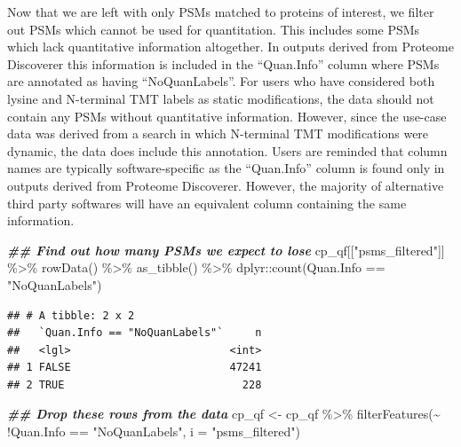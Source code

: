 \documentclass[9pt,a4paper,]{extarticle}
\newenvironment{Shaded}{\begin{snugshade}}{\end{snugshade}}
\newcommand{\AttributeTok}[1]{\textcolor[rgb]{0.77,0.63,0.00}{#1}}
\newcommand{\DocumentationTok}[1]{\textcolor[rgb]{0.56,0.35,0.01}{\textbf{\textit{#1}}}}
\newcommand{\FunctionTok}[1]{\textcolor[rgb]{0.00,0.00,0.00}{#1}}
\newcommand{\NormalTok}[1]{#1}
\newcommand{\OtherTok}[1]{\textcolor[rgb]{0.56,0.35,0.01}{#1}}
\newcommand{\SpecialCharTok}[1]{\textcolor[rgb]{0.00,0.00,0.00}{#1}}
\newcommand{\StringTok}[1]{\textcolor[rgb]{0.31,0.60,0.02}{#1}}
\begin{document}
Now that we are left with only PSMs matched to proteins of interest, we filter
out PSMs which cannot be used for quantitation. This includes some PSMs which
lack quantitative information altogether. In outputs derived from Proteome
Discoverer this information is included in the ``Quan.Info'' column where PSMs are
annotated as having ``NoQuanLabels''. For users who have considered both lysine and
N-terminal TMT labels as static modifications, the data should not contain any
PSMs without quantitative information. However, since the use-case data was
derived from a search in which N-terminal TMT modifications were dynamic, the
data does include this annotation. Users are reminded that column names are
typically software-specific as the ``Quan.Info'' column is found only in outputs
derived from Proteome Discoverer. However, the majority of alternative third
party softwares will have an equivalent column containing the same information.

\begin{Shaded}
\begin{Highlighting}[]
\DocumentationTok{\#\# Find out how many PSMs we expect to lose}
\NormalTok{cp\_qf[[}\StringTok{"psms\_filtered"}\NormalTok{]] }\SpecialCharTok{\%\textgreater{}\%} 
  \FunctionTok{rowData}\NormalTok{() }\SpecialCharTok{\%\textgreater{}\%} 
  \FunctionTok{as\_tibble}\NormalTok{() }\SpecialCharTok{\%\textgreater{}\%} 
\NormalTok{  dplyr}\SpecialCharTok{::}\FunctionTok{count}\NormalTok{(Quan.Info }\SpecialCharTok{==} \StringTok{"NoQuanLabels"}\NormalTok{)}
\end{Highlighting}
\end{Shaded}

\begin{verbatim}
## # A tibble: 2 x 2
##   `Quan.Info == "NoQuanLabels"`     n
##   <lgl>                         <int>
## 1 FALSE                         47241
## 2 TRUE                            228
\end{verbatim}

\begin{Shaded}
\begin{Highlighting}[]
\DocumentationTok{\#\# Drop these rows from the data}
\NormalTok{cp\_qf }\OtherTok{\textless{}{-}}\NormalTok{ cp\_qf }\SpecialCharTok{\%\textgreater{}\%}
  \FunctionTok{filterFeatures}\NormalTok{(}\SpecialCharTok{\textasciitilde{}} \SpecialCharTok{!}\NormalTok{Quan.Info }\SpecialCharTok{==} \StringTok{"NoQuanLabels"}\NormalTok{, }
                 \AttributeTok{i =} \StringTok{"psms\_filtered"}\NormalTok{)}
\end{Highlighting}
\end{Shaded}
\end{document}
